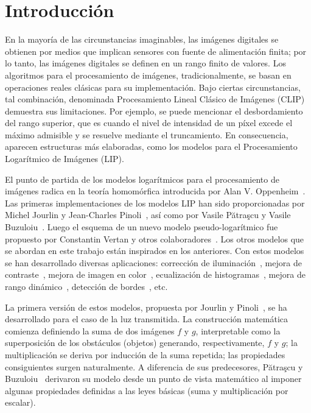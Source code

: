 \chapter*{Introducción}\label{chapter:introduction}

En la mayoría de las circunstancias imaginables, las imágenes digitales se obtienen por medios que implican sensores con fuente de alimentación finita; por lo tanto, las imágenes digitales se definen en un rango finito de valores. Los algoritmos para el procesamiento de imágenes, tradicionalmente, se basan en operaciones reales clásicas para su implementación. Bajo ciertas circunstancias, tal combinación, denominada Procesamiento Lineal Clásico de Imágenes (CLIP) demuestra sus limitaciones. Por ejemplo, se puede mencionar el desbordamiento del rango superior, que es cuando el nivel de intensidad de un p\'ixel excede el m\'aximo admisible y se resuelve mediante el truncamiento. En consecuencia, aparecen estructuras más elaboradas, como los modelos para el Procesamiento Logarítmico de Imágenes (LIP).

El punto de partida de los modelos logarítmicos para el procesamiento de imágenes radica en la teoría homomórfica introducida por Alan V. Oppenheim~\cite{oppenheim1965superposition}. Las primeras implementaciones de los modelos LIP han sido proporcionadas por Michel Jourlin y Jean-Charles Pinoli~\cite{jourlin1988model}, as\'i como por Vasile Pătraşcu y Vasile Buzuloiu~\cite{patrascu2014mathematical}. Luego el esquema de un nuevo modelo pseudo-logarítmico fue propuesto por Constantin Vertan y otros colaboradores~\cite{vertan2008pseudo}. Los otros modelos que se abordan en este trabajo est\'an inspirados en los anteriores. Con estos modelos se han desarrollado diversas aplicaciones: corrección de iluminación~\cite{patrascu2001modele}, mejora de contraste~\cite{deng1995study}, mejora de imagen en color~\cite{patrascu2001modele}, ecualización de histogramas~\cite{puatracscu2003fuzzy}, mejora de rango dinámico~\cite{florea2008use}, detección de bordes~\cite{vertan2008pseudo}, etc.

La primera versi\'on de estos modelos, propuesta por Jourlin y Pinoli~\cite{jourlin1988model}, se ha desarrollado para el caso de la luz transmitida. La construcción matemática comienza definiendo la suma de dos imágenes $f$ y $g$, interpretable como la superposición de los obstáculos (objetos) generando, respectivamente, $f$ y $g$; la multiplicación se deriva por inducción de la suma repetida; las propiedades consiguientes surgen naturalmente. A diferencia de sus predecesores, Pătraşcu y Buzuloiu~\cite{patrascu2014mathematical} derivaron su modelo desde un punto de vista matemático al imponer algunas propiedades definidas a las leyes básicas (suma y multiplicación por escalar).

